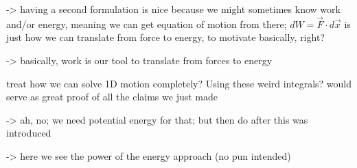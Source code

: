 \documentclass[../class_mech_main.tex]{subfiles}
\begin{document}
-> having a second formulation is nice because we might sometimes know work and/or energy, meaning we can get equation of motion from there; $dW = \vec{F} \cdot d\vec{x}$ is just how we can translate from force to energy, to motivate basically, right?

-> basically, work is our tool to translate from forces to energy




\begin{ex}
	treat how we can solve 1D motion completely? Using these weird integrals? would serve as great proof of all the claims we just made

	-> ah, no; we need potential energy for that; but then do after this was introduced


	-> here we see the power of the energy approach (no pun intended)
\end{ex}
\end{document}
